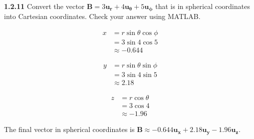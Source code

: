 \documentclass{article}
\begin{document}
\textbf{1.2.11} Convert the vector $\mathbf{B} = 3\mathbf{u_r} + 4\mathbf{u_\theta} + 5\mathbf{u_\phi}$ that is in
spherical coordinates into Cartesian coordinates. Check your answer using MATLAB.\@

\begin{equation*}
	\begin{split}
		x & = r \sin{\theta} \cos{\phi} \\
		& = 3 \sin{4} \cos{5} \\
		& \approx -0.644
	\end{split}
\end{equation*}

\begin{equation*}
	\begin{split}
		y & = r \sin{\theta} \sin{\phi} \\
		& = 3 \sin{4} \sin{5} \\
		& \approx 2.18
	\end{split}
\end{equation*}

\begin{equation*}
	\begin{split}
		z & = r \cos{\theta} \\
		& = 3 \cos{4} \\
		& \approx -1.96
	\end{split}
\end{equation*}

The final vector in spherical coordinates is $\mathbf{B} \approx -0.644\mathbf{u_x} + 2.18\mathbf{u_y} -
	1.96\mathbf{u_z}$.
\end{document}
